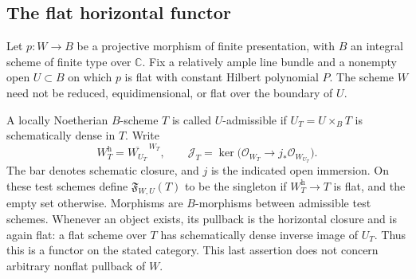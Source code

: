 \documentclass[11pt,reqno]{amsart}
\numberwithin{equation}{section}
\theoremstyle{definition}\newtheorem{definition}[theorem]{Definition}
\theoremstyle{remark}\newtheorem{remark}[theorem]{Remark}
\newcommand{\C}{\mathbb C}\newcommand{\Q}{\mathbb Q}
\newcommand{\OO}{\mathcal O}\newcommand{\II}{\mathcal I}
\begin{document}
\subsection{The flat horizontal functor}
Let $p:W\to B$ be a projective morphism of finite presentation, with
$B$ an integral scheme of finite type over $\C$. Fix a relatively ample
line bundle and a nonempty open $U\subset B$ on which $p$ is flat with
constant Hilbert polynomial $P$. The scheme $W$ need not be reduced,
equidimensional, or flat over the boundary of $U$.

A locally Noetherian $B$-scheme $T$ is called $U$-admissible if
$U_T=U\times_B T$ is schematically dense in $T$. Write
\begin{equation}\label{eq:horizontal-definition-v166}
 W_T^{\mathrm h}=\overline{W_{U_T}}^{\,W_T},\qquad
 \mathcal J_T=\ker\bigl(\OO_{W_T}\longrightarrow
                       j_*\OO_{W_{U_T}}\bigr).
\end{equation}
The bar denotes schematic closure, and $j$ is the indicated open
immersion. On these test schemes define $\mathfrak F_{W,U}(T)$ to be
the singleton if $W_T^{\mathrm h}\to T$ is flat, and the empty set
otherwise. Morphisms are $B$-morphisms between admissible test schemes.
Whenever an object exists, its pullback is the horizontal closure and
is again flat: a flat scheme over $T$ has schematically dense inverse
image of $U_T$. Thus this is a functor on the stated category. This
last assertion does not concern arbitrary nonflat pullback of $W$.
\end{document}
